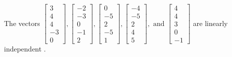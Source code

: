 \begin{exercise}
\begin{exerciseStatement}
  \end{exerciseStatement}
  \begin{exerciseAnswer}
   The vectors \(\left[\begin{array}{r}
3 \\
4 \\
4 \\
-3 \\
0
\end{array}\right] , \left[\begin{array}{r}
-2 \\
-3 \\
0 \\
-1 \\
2
\end{array}\right] , \left[\begin{array}{r}
0 \\
-5 \\
2 \\
-5 \\
1
\end{array}\right] , \left[\begin{array}{r}
-4 \\
-5 \\
2 \\
4 \\
5
\end{array}\right] , \text{ and } \left[\begin{array}{r}
4 \\
4 \\
3 \\
0 \\
-1
\end{array}\right]\) are 
  	 linearly independent  .
  


  \end{exerciseAnswer}
\end{exercise}